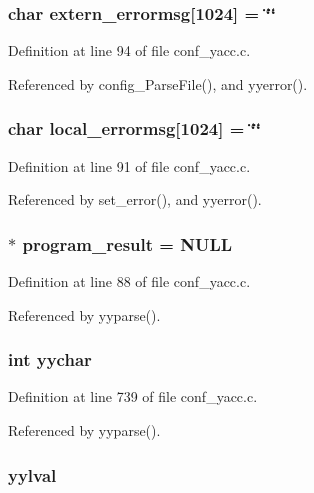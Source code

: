 \subsubsection{\setlength{\rightskip}{0pt plus 5cm}char {\bf extern\_\-errormsg}[1024] = \char`\"{}\char`\"{}}\label{conf__yacc_8c_a61}




Definition at line 94 of file conf\_\-yacc.c.

Referenced by config\_\-Parse\-File(), and yyerror().
\subsubsection{\setlength{\rightskip}{0pt plus 5cm}char {\bf local\_\-errormsg}[1024] = \char`\"{}\char`\"{}}\label{conf__yacc_8c_a60}




Definition at line 91 of file conf\_\-yacc.c.

Referenced by set\_\-error(), and yyerror().
\subsubsection{$\ast$ {\bf program\_\-result} = NULL}\label{conf__yacc_8c_a59}




Definition at line 88 of file conf\_\-yacc.c.

Referenced by yyparse().
\subsubsection{\setlength{\rightskip}{0pt plus 5cm}int {\bf yychar}}\label{conf__yacc_8c_a74}




Definition at line 739 of file conf\_\-yacc.c.

Referenced by yyparse().
\subsubsection{ {\bf yylval}}\label{conf__yacc_8c_a75}




